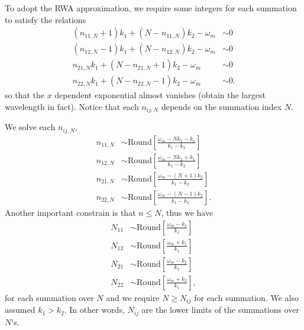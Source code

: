 \documentclass[letterpaper,12pt,english]{sphinxmanual}
\begin{document}
To adopt the RWA approximation, we require some integers for each summation to satisfy the relations
\begin{equation*}
\begin{split}(n_{11,N} + 1)k_1 + (N-n_{11,N}) k_2 -\omega_m &\sim 0 \\
(n_{12,N} - 1)k_1 + (N-n_{12,N}) k_2 -\omega_m &\sim 0 \\
n_{21,N}k_1 + (N-n_{21,N}+1) k_2 -\omega_m &\sim 0 \\
n_{22,N} k_1 + (N-n_{22,N}-1) k_2 -\omega_m &\sim 0.\end{split}
\end{equation*}
so that the \(x\) dependent exponential almost vanishes (obtain the largest wavelength in fact). Notice that each \(n_{ij,N}\) depends on the summation index \(N\).

We solve each \(n_{ij,N}\),
\begin{equation*}
\begin{split}n_{11,N} &\sim \mathrm{Round}\left[\frac{\omega_m - N k_2 -k_1}{k_1 - k_2} \right] \\
n_{12,N} &\sim \mathrm{Round}\left[\frac{\omega_m - N k_2 + k_1}{k_1 - k_2}\right] \\
n_{21,N} &\sim \mathrm{Round}\left[\frac{\omega_m - (N + 1) k_2 }{k_1 - k_2} \right]\\
n_{22,N} &\sim \mathrm{Round}\left[\frac{\omega_m - (N - 1) k_2 }{k_1 - k_2} \right].\end{split}
\end{equation*}
Another important constrain is that \(n\leq N\), thus we have
\begin{equation*}
\begin{split}N_{11} &\sim \mathrm{Round}\left[\frac{\omega_m - k_1}{k_1}\right] \\
N_{12} &\sim \mathrm{Round}\left[\frac{\omega_m + k_1}{k_1}\right] \\
N_{21} &\sim \mathrm{Round}\left[\frac{\omega_m - k_2}{k_1}\right] \\
N_{22} &\sim \mathrm{Round}\left[\frac{\omega_m + k_2}{k_1}\right],\end{split}
\end{equation*}
for each summation over \(N\) and we require \(N\geq N_{ij}\) for each summation. We also assumed \(k_1 > k_2\). In other words, \(N_{ij}\) are the lower limits of the summations over \(N\)`s.
\end{document}
